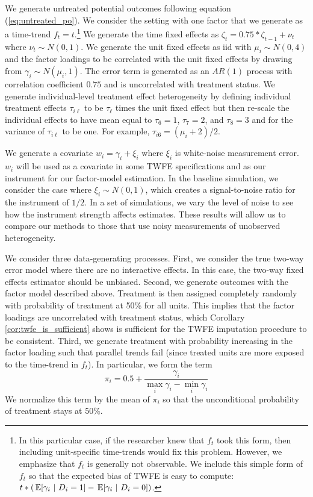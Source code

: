 We generate untreated potential outcomes following equation (\ref{eq:untreated_po}). We consider the setting with one factor that we generate as a time-trend $f_t = t$.\footnote{In this particular case, if the researcher knew that $f_t$ took this form, then including unit-specific time-trends would fix this problem. However, we emphasize that $f_t$ is generally not observable. We include this simple form of $f_t$ so that the expected bias of TWFE is easy to compute: $t * (\expec{\gamma_i}{D_i = 1} - \expec{\gamma_i}{D_i = 0 })$.} We generate the time fixed effects as $\zeta_t = 0.75 * \zeta_{t-1} + \nu_{t}$ where $\nu_{t} \sim N(0,1)$. We generate the unit fixed effects as iid with $\mu_i \sim N(0, 4)$ and the factor loadings to be correlated with the unit fixed effects by drawing from $\gamma_i \sim N(\mu_i, 1)$. The error term is generated as an $AR(1)$ process with correlation coefficient $0.75$ and is uncorrelated with treatment status. We generate individual-level treatment effect heterogeneity by defining individual treatment effects $\tau_{i\ell}$ to be $\tau_\ell$ times the unit fixed effect but then re-scale the individual effects to have mean equal to $\tau_6 = 1$, $\tau_7 = 2$, and $\tau_8 = 3$ and for the variance of $\tau_{i\ell}$ to be one. For example, $\tau_{i6} = (\mu_i + 2)/2$. 

We generate a covariate $w_i = \gamma_i + \xi_i$ where $\xi_i$ is white-noise measurement error. $w_i$ will be used as a covariate in some TWFE specifications and as our instrument for our factor-model estimation. In the baseline simulation, we consider the case where $\xi_i \sim N(0, 1)$, which creates a signal-to-noise ratio for the instrument of $1/2$. In a set of simulations, we vary the level of noise to see how the instrument strength affects estimates. These results will allow us to compare our methods to those that use noisy measurements of unobserved heterogeneity.

We consider three data-generating processes. First, we consider the true two-way error model where there are no interactive effects. In this case, the two-way fixed effects estimator should be unbiased. Second, we generate outcomes with the factor model described above. Treatment is then assigned completely randomly with probability of treatment at 50\% for all units. This implies that the factor loadings are uncorrelated with treatment status, which Corollary \ref{cor:twfe_is_sufficient} shows is sufficient for the TWFE imputation procedure to be consistent. Third, we generate treatment with probability increasing in the factor loading such that parallel trends fail (since treated units are more exposed to the time-trend in $f_t$). In particular, we form the term
\begin{equation}
\pi_i = 0.5 + \frac{\gamma_{i}}{\max_i \gamma_i - \min_i \gamma_i}
\end{equation}
We normalize this term by the mean of $\pi_i$ so that the unconditional probability of treatment stays at 50\%.

